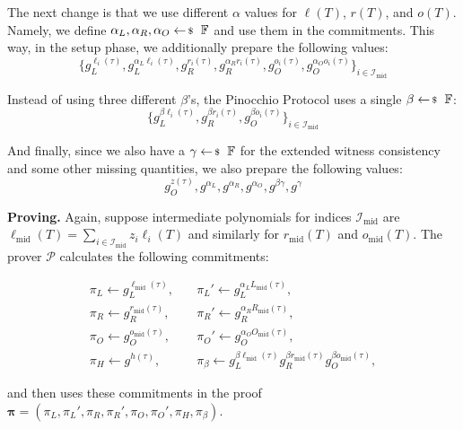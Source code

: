 \documentclass[../../book.tex]{subfiles}
\begin{document}
The next change is that we use different $\alpha$ values for $\ell(T)$, $r(T)$, and $o(T)$. Namely, we define $\alpha_L,\alpha_R,\alpha_O \leftarrowS \mathbb{F}$ and use them in the commitments. This way, in the setup phase, we additionally prepare the following values:
\begin{equation*}
    \{g_L^{\ell_i(\tau)}, g_L^{\alpha_L\ell_i(\tau)}, g_R^{r_i(\tau)}, g_R^{\alpha_Rr_i(\tau)}, g_O^{o_i(\tau)}, g_O^{\alpha_O o_i(\tau)}\}_{i \in \mathcal{I}_{\text{mid}}}
\end{equation*}

Instead of using three different $\beta$'s, the Pinocchio Protocol uses a single $\beta \leftarrowS \mathbb{F}$:
\begin{equation*}
    \{g_L^{\beta \ell_i(\tau)}, g_R^{\beta r_i(\tau)},g_O^{\beta o_i(\tau)} \}_{i \in \mathcal{I}_{\text{mid}}}
\end{equation*}

And finally, since we also have a $\gamma \leftarrowS \mathbb{F}$ for the extended witness consistency and some other missing quantities, we also prepare the following values:
\begin{equation*}
    g_O^{z(\tau)}, g^{\alpha_L}, g^{\alpha_R}, g^{\alpha_O},g^{\beta\gamma}, g^{\gamma}
\end{equation*}

\textcolor{green!50!black}{\textbf{Proving.}} Again, suppose intermediate polynomials for indices $\mathcal{I}_{\text{mid}}$ are $\ell_{\text{mid}}(T) = \sum_{i \in \mathcal{I}_{\text{mid}}}z_i\ell_i(T)$ and similarly for $r_{\text{mid}}(T)$ and $o_{\text{mid}}(T)$. The prover $\mathcal{P}$ calculates the following commitments:

\begin{align*}
    \pi_L \gets g_L^{\ell_{\text{mid}}(\tau)}, & \quad \pi_L' \gets g_L^{\alpha_LL_{\text{mid}}(\tau)}, \\
    \pi_R \gets g_R^{r_{\text{mid}}(\tau)}, & \quad \pi_R' \gets g_R^{\alpha_RR_{\text{mid}}(\tau)}, \\
    \pi_O \gets g_O^{o_{\text{mid}}(\tau)}, & \quad \pi_O' \gets g_O^{\alpha_OO_{\text{mid}}(\tau)}, \\
    \pi_H \gets g^{h(\tau)}, & \quad \pi_{\beta} \gets g_L^{\beta \ell_{\text{mid}}(\tau)}g_R^{\beta r_{\text{mid}}(\tau)}g_O^{\beta o_{\text{mid}}(\tau)},
\end{align*}

and then uses these commitments in the proof $\boldsymbol{\pi} = (\pi_L,\pi_L',\pi_R,\pi_R',\pi_O,\pi_O',\pi_H,\pi_{\beta})$.
\end{document}
